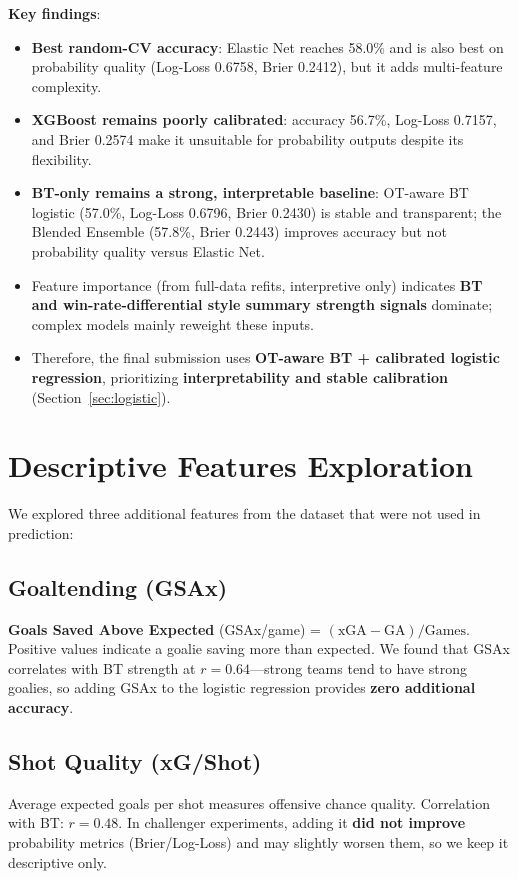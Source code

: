 \documentclass[11pt, a4paper]{article}
\begin{document}
\noindent\textbf{Key findings}:
\begin{itemize}[nosep]
    \item \textbf{Best random-CV accuracy}: Elastic Net reaches 58.0\% and is also best on probability quality (Log-Loss 0.6758, Brier 0.2412), but it adds multi-feature complexity.
    \item \textbf{XGBoost remains poorly calibrated}: accuracy 56.7\%, Log-Loss 0.7157, and Brier 0.2574 make it unsuitable for probability outputs despite its flexibility.
    \item \textbf{BT-only remains a strong, interpretable baseline}: OT-aware BT logistic (57.0\%, Log-Loss 0.6796, Brier 0.2430) is stable and transparent; the Blended Ensemble (57.8\%, Brier 0.2443) improves accuracy but not probability quality versus Elastic Net.
    \item Feature importance (from full-data refits, interpretive only) indicates \textbf{BT and win-rate-differential style summary strength signals} dominate; complex models mainly reweight these inputs.
    \item Therefore, the final submission uses \textbf{OT-aware BT + calibrated logistic regression}, prioritizing \textbf{interpretability and stable calibration} (Section~\ref{sec:logistic}).
\end{itemize}

\section{Descriptive Features Exploration}
\label{sec:descriptive}

We explored three additional features from the dataset that were not used in prediction:

\subsection{Goaltending (GSAx)}
\textbf{Goals Saved Above Expected} (GSAx/game) = $(\text{xGA} - \text{GA}) / \text{Games}$. Positive values indicate a goalie saving more than expected. We found that GSAx correlates with BT strength at $r = 0.64$---strong teams tend to have strong goalies, so adding GSAx to the logistic regression provides \textbf{zero additional accuracy}.

\subsection{Shot Quality (xG/Shot)}
Average expected goals per shot measures offensive chance quality. Correlation with BT: $r = 0.48$. In challenger experiments, adding it \textbf{did not improve} probability metrics (Brier/Log-Loss) and may slightly worsen them, so we keep it descriptive only.
\end{document}
